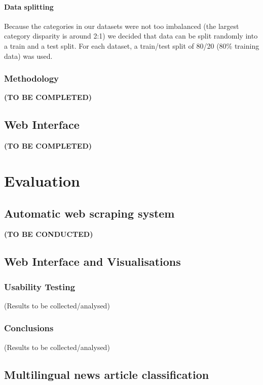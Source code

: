 \documentclass{l4proj}
\begin{document}
\subsubsection{Data splitting} \hfill \par
Because the categories in our datasets were not too imbalanced (the largest category disparity is around 2:1) we decided that data can be split randomly into a train and a test split. For each dataset, a train/test split of 80/20 (80\% training data) was used.

\subsection{Methodology}
\textbf{(TO BE COMPLETED)}
\section{Web Interface}
\textbf{(TO BE COMPLETED)}
\chapter{Evaluation}

\section{Automatic web scraping system}
\textbf{(TO BE CONDUCTED)}
\section{Web Interface and Visualisations}
\subsection{Usability Testing}
(Results to be collected/analysed)
\subsection{Conclusions}
(Results to be collected/analysed)
\section{Multilingual news article classification}
\end{document}
